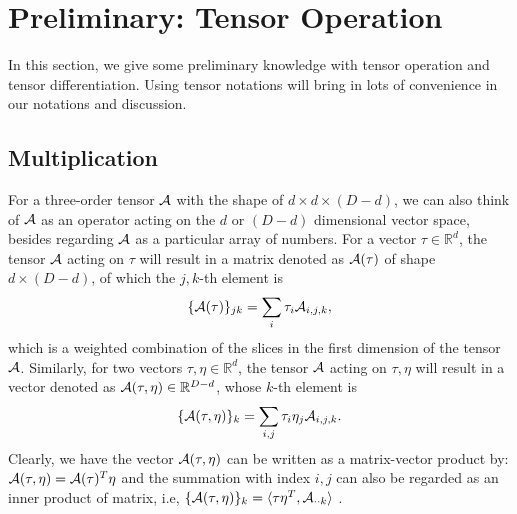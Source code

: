 \documentclass[aos,preprint]{imsart}
\theoremstyle{remark}
\begin{document}
\section{Preliminary: Tensor Operation} 
In this section, we give some preliminary knowledge with tensor operation and tensor differentiation. Using tensor notations  will bring in lots of convenience in our notations and discussion.
\subsection{Multiplication}
For a three-order tensor $\cal A$ with the shape of $d\times d\times (D-d)$, 
we can also think of $\cal A$ as an operator acting on the $d$ or $(D-d)$ dimensional vector space, besides regarding $\cal A$ as a particular array of numbers.
For a vector $\tau \in {\mathbb R}^d$, the tensor $\cal A$ acting on $\tau$ will result in a matrix denoted as ${\cal A}(\tau)$ of shape $d\times (D-d)$, of which the $j,k$-th element is
\[
\{{\cal A}(\tau)\}_{jk} = \sum_i \tau_i {\cal A}_{i,j,k},
\]
which is a weighted combination of the slices in the first dimension of the tensor $\cal A$.
Similarly, for two vectors $\tau,\eta\in {\mathbb R}^d$, the tensor $\cal A$ acting on $\tau,\eta$ will result in a vector denoted as ${\cal A}(\tau,\eta)\in {\mathbb R}^{D-d}$, whose $k$-th element is
\[
\{{\cal A}(\tau,\eta)\}_{k} = \sum_{i,j} \tau_i \eta_j {\cal A}_{i,j,k} .
\]
Clearly, we have the vector ${\cal A}(\tau,\eta)$ can be written as a matrix-vector product by: $ {\cal A}(\tau,\eta) = {\cal A}(\tau)^T \eta$ and the summation with index $i,j$ can also be regarded as an inner product of matrix, i.e, $\{{\cal A}(\tau,\eta)\}_{k}=\langle\tau\eta^T ,{\cal A}_{\cdot\cdot k}  \rangle $ .%
\end{document}
